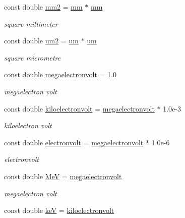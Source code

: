 \begin{DoxyCompactItemize}
const double \hyperlink{namespace_utilities_a1bfe965c55c47b8f84c53b95d527da39}{mm2} = \hyperlink{namespace_utilities_ada68d4ec8f02c2ffc43db9220cbdcba8}{mm} $\ast$ \hyperlink{namespace_utilities_ada68d4ec8f02c2ffc43db9220cbdcba8}{mm}
\begin{DoxyCompactList}\small\item\em square millimeter \end{DoxyCompactList}\item 
const double \hyperlink{namespace_utilities_a89e97d06d21d5752d28b987caca1164e}{um2} = \hyperlink{namespace_utilities_a79bb1876d9d2416239e3ca0b57582018}{um} $\ast$ \hyperlink{namespace_utilities_a79bb1876d9d2416239e3ca0b57582018}{um}
\begin{DoxyCompactList}\small\item\em square micrometre \end{DoxyCompactList}\item 
const double \hyperlink{namespace_utilities_a9ae5f215b36e4775746428f61852bff9}{megaelectronvolt} = 1.0
\begin{DoxyCompactList}\small\item\em megaelectron volt \end{DoxyCompactList}\item 
const double \hyperlink{namespace_utilities_adf9960a6afad6c0ee02c6a8104fe0bac}{kiloelectronvolt} = \hyperlink{namespace_utilities_a9ae5f215b36e4775746428f61852bff9}{megaelectronvolt} $\ast$ 1.0e-\/3
\begin{DoxyCompactList}\small\item\em kiloelectron volt \end{DoxyCompactList}\item 
const double \hyperlink{namespace_utilities_a0045e627e65f14bccdf9ba29f46f4b39}{electronvolt} = \hyperlink{namespace_utilities_a9ae5f215b36e4775746428f61852bff9}{megaelectronvolt} $\ast$ 1.0e-\/6
\begin{DoxyCompactList}\small\item\em electronvolt \end{DoxyCompactList}\item 
const double \hyperlink{namespace_utilities_a26374683c027fd82866b27124597f903}{MeV} = \hyperlink{namespace_utilities_a9ae5f215b36e4775746428f61852bff9}{megaelectronvolt}
\begin{DoxyCompactList}\small\item\em megaelectron volt \end{DoxyCompactList}\item 
const double \hyperlink{namespace_utilities_a767ae2d5cc9d3f6e952a73c396d6a76b}{keV} = \hyperlink{namespace_utilities_adf9960a6afad6c0ee02c6a8104fe0bac}{kiloelectronvolt}

\end{DoxyCompactItemize}
